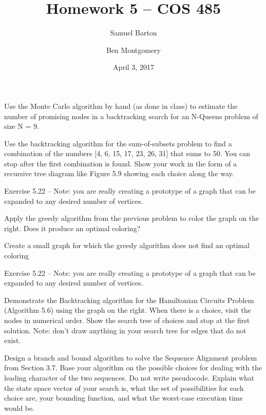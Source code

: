 \documentclass[12pt]{article}
\newenvironment{problem}[2][Problem]{\begin{trivlist}
\item[\hskip \labelsep {\bfseries #1}\hskip \labelsep {\bfseries #2.}]}{\end{trivlist}}
\begin{document}
\title{Homework 5 -- COS 485}
\author{Samuel Barton \and Ben Montgomery}
\date{April 3, 2017}
 
\maketitle
\begin{problem}{1}
Use the Monte Carlo algorithm by hand (as done in class) to estimate the number
of promising nodes in a backtracking search for an N-Queens problem of size N = 9.
\end{problem}

\begin{problem}{2}
Use the backtracking algorithm for the sum-of-subsets problem to find a combination of the numbers [4, 6, 15, 17, 23, 26, 31] that sums to 50. You can stop after the first combination is found. Show your work in the form of a recursive tree diagram like Figure 5.9 showing each choice along the way.
\end{problem}

\begin{problem}{3}
Exercise 5.22 – Note: you are really creating a prototype of a graph that can be expanded to any desired number of vertices. 
\end{problem}

\begin{problem}{4}
Apply the greedy algorithm from the previous problem to color the graph on the right. Does it produce an optimal coloring?
\end{problem}

\begin{problem}{5}
Create a small graph for which the greedy algorithm does not find an optimal coloring
\end{problem}

\begin{problem}{6}
Exercise 5.22 – Note: you are really creating a prototype of a graph that can be expanded to any desired number of vertices.
\end{problem}
\begin{problem}{7}
Demonstrate the Backtracking algorithm for the Hamiltonian Circuits Problem (Algorithm 5.6) using the graph on the right. When there is a choice, visit the nodes in numerical order. Show the search tree of choices and stop at the first solution. Note: don’t draw anything in your search tree for edges that do not exist.
\end{problem}
\begin{problem}{8}
Design a branch and bound algorithm to solve the Sequence Alignment problem from Section 3.7. Base your algorithm on the possible
choices for dealing with the leading character of the two sequences. Do not write pseudocode. Explain what the state space vector of your search is, what the set of possibilities for each choice are, your bounding function, and what the worst-case execution time would be.
\end{problem}
\end{document}
